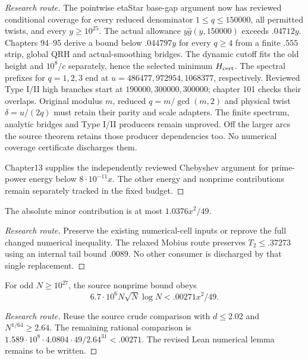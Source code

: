 \begin{proof}[Research route]
The pointwise etaStar base-gap argument now has reviewed conditional
coverage for every reduced denominator $1\le q\le150000$, all permitted
twists, and every $y\ge10^{25}$. The actual allowance
$y\widehat g(y,150000)$ exceeds $.04712y$. Chapters 94--95 derive
a bound below $.044797y$ for every $q\ge4$ from a finite $.555$ strip,
global QRH and actual-smoothing bridges. The dynamic cutoff fits the old
height and $10^8/c$ separately, hence the selected minimum $H_{\rm cert}$.
The spectral prefixes for $q=1,2,3$ end at
$u=486477,972954,1068377$, respectively. Reviewed Type I/II high branches
start at $190000,300000,300000$; chapter 101 checks their overlaps.
Original modulus $m$, reduced $q=m/\gcd(m,2)$ and physical twist
$\delta=u/(2q)$ must retain their parity and scale adapters.
The finite spectrum, analytic bridges and Type I/II producers remain
unproved. Off the larger arcs the source theorem retains those producer
dependencies too. No numerical coverage certificate discharges them.

Chapter13 supplies the independently reviewed Chebyshev argument for
prime-power energy below $8\cdot10^{-11}x$. The other energy and
nonprime contributions remain separately tracked in the fixed budget.
\end{proof}

\begin{theorem}\label{minor}\notready
The absolute minor contribution is at most $1.0376x^2/49$.
\end{theorem}
\begin{proof}[Research route]
Preserve the existing numerical-cell inputs or reprove the full changed
numerical inequality. The relaxed Mobius route preserves $T_2\le.37273$
using an internal tail bound $.0089$. No other consumer is discharged by
that single replacement.
\end{proof}

\begin{theorem}\label{nonprime}\notready
For odd $N\ge10^{27}$, the source nonprime bound obeys
\[6.7\cdot10^6N\sqrt N\log N<.00271x^2/49.\]
\end{theorem}
\begin{proof}[Research route]
Reuse the source crude comparison with $d\le2.02$ and $N^{1/64}\ge2.64$.
The remaining rational comparison is
$1.589\cdot10^8\cdot4.0804\cdot49/2.64^{31}<.00271$.
The revised Lean numerical lemma remains to be written.
\end{proof}

